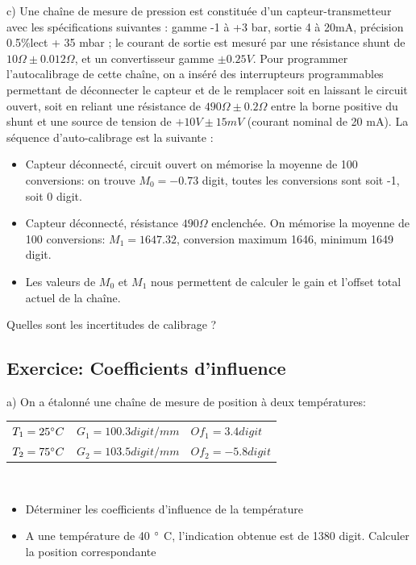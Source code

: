 c)	Une chaîne de mesure de pression est constituée d'un capteur-transmetteur avec les spécifications suivantes : gamme -1 à +3 bar, sortie 4 à 20mA, précision 0.5\%lect + 35 mbar ; le courant de sortie est mesuré par une résistance shunt de $10 \Omega \pm 0.012 \Omega$, et un convertisseur gamme $\pm 0.25V$.
Pour programmer l'autocalibrage de cette chaîne, on a inséré des interrupteurs programmables permettant de déconnecter le capteur et de le remplacer soit en laissant le circuit ouvert, soit en reliant une résistance de $490 \Omega \pm 0.2 \Omega$ entre la borne positive du shunt et une source de tension de $+10V \pm 15mV$ (courant nominal de 20 mA). La séquence d'auto-calibrage est la suivante :
\begin{itemize}\itemsep1pt
\renewcommand{\labelitemi}{$\bullet$}
\item Capteur déconnecté, circuit ouvert on mémorise la moyenne de 100 conversions: on trouve $M_0=-0.73$ digit, toutes les conversions sont soit -1, soit 0 digit.
\item Capteur déconnecté, résistance $490 \Omega$ enclenchée. On mémorise la moyenne de 100 conversions: $M_1=1647.32$, conversion maximum 1646, minimum 1649 digit.
\item Les valeurs de $M_0$ et $M_1$ nous permettent de calculer le gain et l'offset total actuel de la chaîne.
\end{itemize}

Quelles sont les incertitudes de calibrage ?

\subsection{Exercice: Coefficients d'influence}

a)	On a étalonné une chaîne de mesure de position à deux températures:


\begin {center}
\begin{tabular}{lll}
$T_1=25 \degree C$ &	$G_1= 100.3 digit/mm$ &	$Of_1 = 3.4 digit$ \\
$T_2=75 \degree C$ &	$G_2 = 103.5 digit/mm$ &	$Of_2 = -5.8 digit$ \\
\end{tabular}
\end{center}
~\\
\begin{itemize}\itemsep1pt
\renewcommand{\labelitemi}{$\bullet$}
\item Déterminer les coefficients d'influence de la température
\item A une température de 40 $\degree$ C, l'indication obtenue est de 1380 digit. Calculer la position correspondante
\end{itemize}
~\\


